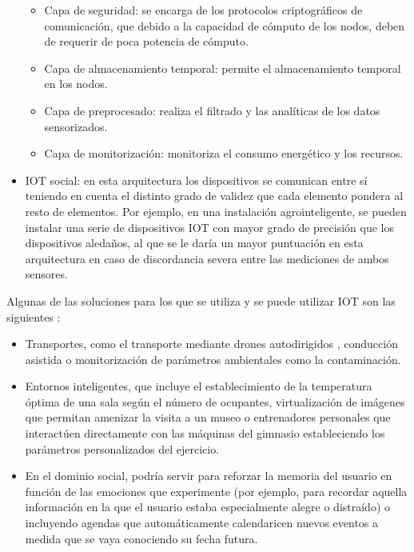 \begin{itemize}
    \begin{itemize}
        \item Capa de seguridad: se encarga de los protocolos criptográficos de comunicación, que debido a la capacidad de cómputo de los nodos, deben de requerir de poca potencia de cómputo.
        \item Capa de almacenamiento temporal: permite el almacenamiento temporal en los nodos.
        \item Capa de preprocesado: realiza el filtrado y las analíticas de los datos sensorizados.
        \item Capa de monitorización: monitoriza el consumo energético y los recursos.
    \end{itemize}
    \item IOT social: en esta arquitectura los dispositivos se comunican entre sí teniendo en cuenta el distinto grado de validez que cada elemento pondera al resto de elementos. Por ejemplo, en una instalación agrointeligente, se pueden instalar una serie de dispositivos IOT con mayor grado de precisión que los dispositivos aledaños, al que se le daría un mayor puntuación en esta arquitectura en caso de discordancia severa entre las mediciones de ambos sensores.
\end{itemize}

Algunas de las soluciones para los que se utiliza y se puede utilizar IOT son las siguientes \citep{atzori2010internet}:
\begin{itemize}
    \item Transportes, como el transporte mediante drones autodirigidos \citep{amazon}, conducción asistida o monitorización de parámetros ambientales como la contaminación.
    \item Entornos inteligentes, que incluye el establecimiento de la temperatura óptima de una sala según el número de ocupantes, virtualización de imágenes que permitan amenizar la visita a un museo o entrenadores personales que interactúen directamente con las máquinas del gimnasio estableciendo los parámetros personalizados del ejercicio.
    \item En el dominio social, podría servir para reforzar la memoria del usuario en función de las emociones que experimente (por ejemplo, para recordar aquella información en la que el usuario estaba especialmente alegre o distraído) \citep{picard1997affective} o incluyendo agendas que automáticamente calendaricen nuevos eventos a medida que se vaya conociendo su fecha futura.
\end{itemize}

